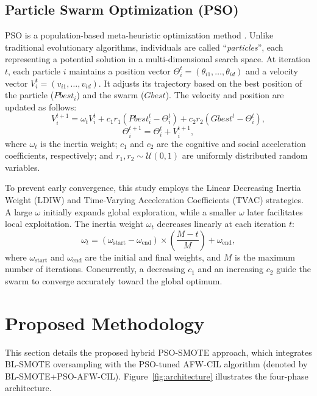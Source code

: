 \documentclass[pdflatex,sn-mathphys-num]{sn-jnl}%
\theoremstyle{thmstyleone}%
\theoremstyle{thmstyletwo}
\theoremstyle{thmstylethree}
\begin{document}
\subsection{Particle Swarm Optimization (PSO)}\label{subsec2_3}
PSO is a population-based meta-heuristic optimization method \cite{kennedy1995particle}. Unlike traditional evolutionary algorithms, individuals are called ``\textit{particles}'', each representing a potential solution in a multi-dimensional search space. At iteration $t$, each particle $i$ maintains a position vector $\Theta_i^t = (\theta_{i1}, \dots, \theta_{id})$ and a velocity vector $V_i^t = (v_{i1}, \dots, v_{id})$. It adjusts its trajectory based on the best position of the particle ($\mathit{Pbest}_i$) and the swarm ($\mathit{Gbest}$). The velocity and position are updated as follows:
\begin{equation} \label{eq:pso_v}
    V_i^{t+1} = \omega_t V_i^t + c_1 r_1 (\mathit{Pbest}_i^t - \Theta_i^t) + c_2 r_2 (\mathit{Gbest}^t - \Theta_i^t),
\end{equation}
\begin{equation} \label{eq:pso_x}
    \Theta_i^{t+1} = \Theta_i^t + V_i^{t+1},
\end{equation}
where $\omega_t$ is the inertia weight; $c_1$ and $c_2$ are the cognitive and social acceleration coefficients, respectively; and $r_1, r_2 \sim \mathcal{U}(0, 1)$ are uniformly distributed random variables.

To prevent early convergence, this study employs the Linear Decreasing Inertia Weight (LDIW) and Time-Varying Acceleration Coefficients (TVAC) strategies. A large $\omega$ initially expands global exploration, while a smaller $\omega$ later facilitates local exploitation. The inertia weight $\omega_t$ decreases linearly at each iteration $t$:
\begin{equation} \label{eq:ldiw}
    \omega_t = (\omega_{\mathrm{start}} - \omega_{\mathrm{end}}) \times \left( \frac{M - t}{M} \right) + \omega_{\mathrm{end}},
\end{equation}
where $\omega_{\mathrm{start}}$ and $\omega_{\mathrm{end}}$ are the initial and final weights, and $M$ is the maximum number of iterations. Concurrently, a decreasing $c_1$ and an increasing $c_2$ guide the swarm to converge accurately toward the global optimum.



\section{Proposed Methodology}\label{sec:proposed_method}
This section details the proposed hybrid PSO-SMOTE approach, which integrates BL-SMOTE oversampling with the PSO-tuned AFW-CIL algorithm (denoted by BL-SMOTE+PSO-AFW-CIL). Figure~\ref{fig:architecture} illustrates the four-phase architecture.
\end{document}
